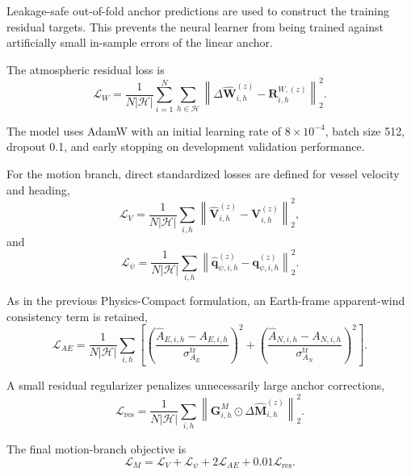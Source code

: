 Leakage-safe out-of-fold anchor predictions are used to construct the training residual targets. This prevents the neural learner from being trained against artificially small in-sample errors of the linear anchor.

The atmospheric residual loss is
\begin{equation}
\mathcal L_W
=
\frac{1}{
N
\left|
\mathcal H
\right|
}
\sum_{i=1}^{N}
\sum_{h\in\mathcal H}
\left\|
\Delta\hat{\mathbf W}^{(z)}_{i,h}
-
\mathbf R^{W,(z)}_{i,h}
\right\|_2^2.
\label{eq:wind_loss}
\end{equation}

The model uses AdamW with an initial learning rate of $8\times10^{-4}$, batch size 512, dropout 0.1, and early stopping on development validation performance.

For the motion branch, direct standardized losses are defined for vessel velocity and heading,
\begin{equation}
\mathcal L_V
=
\frac{1}{
N
\left|
\mathcal H
\right|
}
\sum_{i,h}
\left\|
\hat{\mathbf V}^{(z)}_{i,h}
-
\mathbf V^{(z)}_{i,h}
\right\|_2^2,
\label{eq:vessel_loss}
\end{equation}
and
\begin{equation}
\mathcal L_\psi
=
\frac{1}{
N
\left|
\mathcal H
\right|
}
\sum_{i,h}
\left\|
\hat{\mathbf q}^{(z)}_{\psi,i,h}
-
\mathbf q^{(z)}_{\psi,i,h}
\right\|_2^2.
\label{eq:heading_loss}
\end{equation}

As in the previous Physics-Compact formulation, an Earth-frame apparent-wind consistency term is retained,
\begin{equation}
\mathcal L_{AE}
=
\frac{1}{
N
\left|
\mathcal H
\right|
}
\sum_{i,h}
\left[
\left(
\frac{
\hat A_{E,i,h}
-
A_{E,i,h}
}{
\sigma^{\mathrm{tr}}_{A_E}
}
\right)^2
+
\left(
\frac{
\hat A_{N,i,h}
-
A_{N,i,h}
}{
\sigma^{\mathrm{tr}}_{A_N}
}
\right)^2
\right].
\label{eq:apparent_loss}
\end{equation}

A small residual regularizer penalizes unnecessarily large anchor corrections,
\begin{equation}
\mathcal L_{\mathrm{res}}
=
\frac{1}{
N
\left|
\mathcal H
\right|
}
\sum_{i,h}
\left\|
\mathbf G^M_{i,h}
\odot
\Delta\hat{\mathbf M}^{(z)}_{i,h}
\right\|_2^2.
\label{eq:residual_regularization}
\end{equation}

The final motion-branch objective is
\begin{equation}
\boxed{
\mathcal L_M
=
\mathcal L_V
+
\mathcal L_\psi
+
2\mathcal L_{AE}
+
0.01\mathcal L_{\mathrm{res}}
}.
\label{eq:motion_total_loss}
\end{equation}

